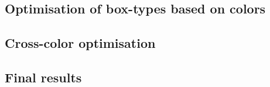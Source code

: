 \documentclass{beamer}
\begin{document}
\begin{frame}
\end{frame}

\subsection{Optimisation of box-types based on colors}


\subsection{Cross-color optimisation}


\subsection{Final results}

\end{document}
